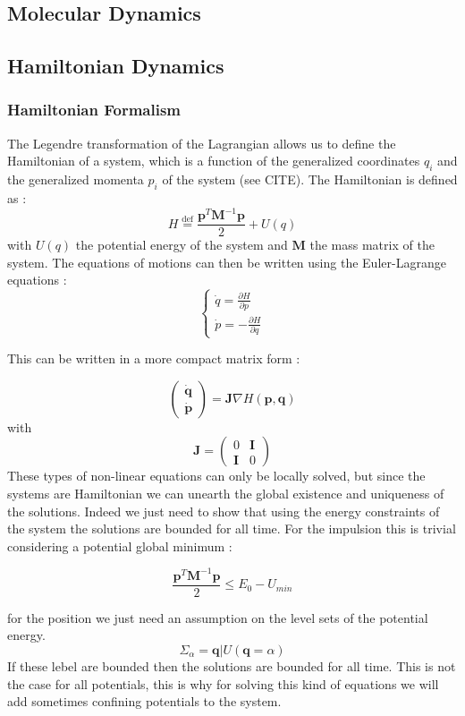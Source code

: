 \documentclass[ansiapaper]{report}
\newcommand*{\defeq}{\stackrel{\text{def}}{=}}
\begin{document}
\begin{multicols}{3}
  \chapter{Molecular Dynamics}
  \section{Hamiltonian Dynamics}
  \subsection{Hamiltonian Formalism}

  The Legendre transformation of the Lagrangian allows us to define the Hamiltonian of a system, which is a function of the generalized coordinates $q_i$ and the generalized momenta $p_i$ of the system (see CITE). The Hamiltonian is defined as :
  $$ H \defeq \frac{\textbf{p} ^T \textbf{M} ^{-1} \textbf{p}  }{2} + U(q)$$
  with $U(q)$ the potential energy of the system and $\textbf{M}$ the mass matrix of the system. The equations of motions can then be written using the Euler-Lagrange equations :
  $$
    \begin{cases}
      \dot{q} = \frac{\partial H}{\partial p} \\
      \dot{p} = -\frac{\partial H}{\partial q}
    \end{cases}
  $$

  This can be written in a more compact matrix form :

  $$ \begin{pmatrix}
      \dot{\textbf{q} } \\
      \dot{\textbf{p} }
    \end{pmatrix} = \textbf{J} \nabla H(\textbf{p} ,\textbf{q} )
  $$
  with $$\textbf{J} = \begin{pmatrix}
      0          & \textbf{I} \\
      \textbf{I} & 0
    \end{pmatrix} $$
  These types of non-linear equations can only be locally solved, but since the systems are Hamiltonian we can unearth the global existence and uniqueness of the solutions. Indeed we just need to show that using the energy constraints of the system the solutions are bounded for all time. For the impulsion this is trivial considering a potential global minimum :

  $$ \frac{\textbf{p}^T \textbf{M} ^{-1} \textbf{p} }{2} \leq E_0 - U_{min}$$

  for the position we just need an assumption on the level sets of the potential energy. $$ \Sigma_{\alpha} = {\textbf{q}|U(\textbf{q} = \alpha) }$$
  If these lebel are bounded then the solutions are bounded for all time. This is not the case for all potentials, this is why for solving this kind of equations we will add sometimes confining potentials to the system.

\end{multicols}
\end{document}
